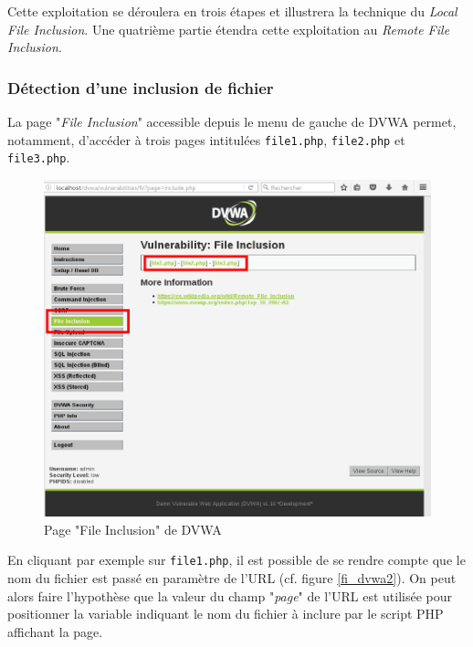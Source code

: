 Cette exploitation se déroulera en trois étapes et illustrera la technique du \textit{Local File Inclusion}. Une quatrième partie étendra cette exploitation au \textit{Remote File Inclusion}.

\subsubsection{Détection d'une inclusion de fichier}

La page "\textit{File Inclusion}" accessible depuis le menu de gauche de DVWA permet, notamment, d'accéder à trois pages intitulées \texttt{file1.php}, \texttt{file2.php} et \texttt{file3.php}. 

\begin{figure}[!h]
\begin{center}
\includegraphics[scale=.34]{images/fi1.png}

\caption{Page "File Inclusion" de DVWA}
\label{fi_dvwa1}
\end{center}
\end{figure}

En cliquant par exemple sur \texttt{file1.php}, il est possible de se rendre compte que le nom du fichier est passé en paramètre de l'URL (cf. figure \ref{fi_dvwa2}). On peut alors faire l'hypothèse que la valeur du champ "\textit{page}" de l'URL est utilisée pour positionner la variable indiquant le nom du fichier à inclure par le script PHP affichant la page. 

